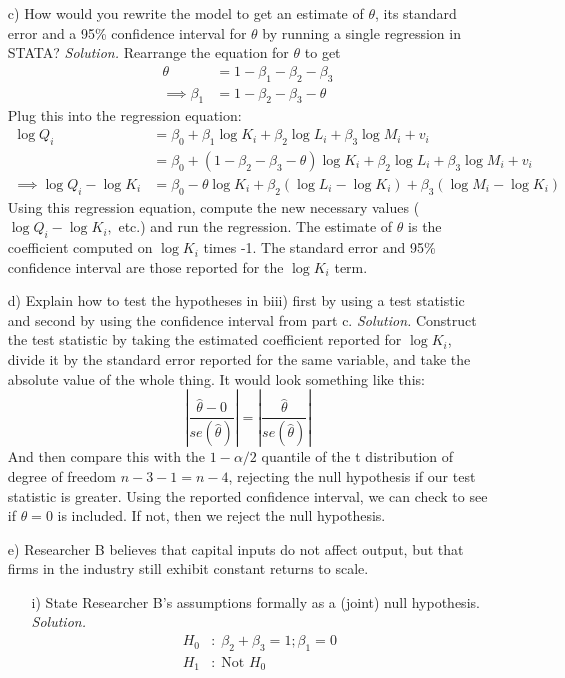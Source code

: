 \documentclass[
]{article}
\begin{document}
\begin{enumerate}
\begin{enumerate}
\end{enumerate}
\item[c)] How would you rewrite the model to get an estimate of $\theta$, its standard error and a 95\% confidence interval for $\theta$ by running a single regression in STATA?
\newline
\newline
\textit{Solution.}
Rearrange the equation for $\theta$ to get
\[\begin{aligned}
\theta &= 1 - \beta_1 - \beta_2 - \beta_3 \\
\implies \beta_1 &= 1  - \beta_2 - \beta_3 - \theta
\end{aligned}\]
Plug this into the regression equation:
\[\begin{aligned}
\log Q_i &= \beta_0 + \beta_1 \log K_i + \beta_2 \log L_i + \beta_3 \log M_i + v_i \\
 &= \beta_0 + (1  - \beta_2 - \beta_3 - \theta) \log K_i + \beta_2 \log L_i + \beta_3 \log M_i + v_i \\
 \implies \log Q_i - \log K_i &= \beta_0 - \theta \log K_i+ \beta_2(\log L_i - \log K_i) + \beta_3 (\log M_i - \log K_i)
\end{aligned}\]
Using this regression equation, compute the new necessary values ($\log Q_i - \log K_i,$ etc.) and run the regression. The estimate of $\theta$ is the coefficient computed on $\log K_i$ times -1. The standard error and 95\% confidence interval are those reported for the $\log K_i$ term. 

\item[d)]  Explain how to test the hypotheses in biii) first by using a test statistic and second by using the confidence interval from part c.
\newline
\newline
\textit{Solution.}
Construct the test statistic by taking the estimated coefficient reported for $\log K_i$, divide it by the standard error reported for the same variable, and take the absolute value of the whole thing. It would look something like this:
\[| \frac{\hat{\theta}-0}{se(\hat{\theta})}| = | \frac{\hat{\theta}}{se(\hat{\theta})}|\]
And then compare this with the $1-\alpha/2$ quantile of the t distribution of degree of freedom $n-3-1 = n - 4$, rejecting the null hypothesis if our test statistic is greater. Using the reported confidence interval, we can check to see if $\theta = 0$ is included. If not, then we reject the null hypothesis. 

\item[e)] Researcher B believes that capital inputs do not affect output, but that firms in the industry still exhibit constant returns to scale.
\begin{enumerate}
\item[i)] State Researcher B’s assumptions formally as a (joint) null hypothesis.
\newline
\newline
\textit{Solution.}
\[\begin{aligned}
H_0&: \; \beta_2 + \beta_3 = 1; \beta_1 = 0 \\
H_1&: \; \text{Not } H_0
\end{aligned}\]


\end{enumerate}
\end{enumerate}
\end{document}
